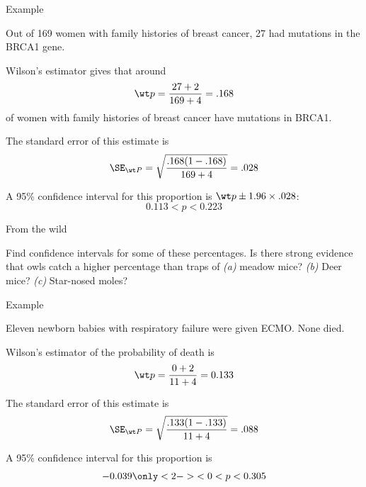 \begin{frame}{Example}

    Out of 169 women with family histories of breast cancer, 27 had mutations in the BRCA1 gene.

    \vspace{2em}

    \alert{Wilson's estimator} gives that around
        \[ \wt p = \frac{27 + 2}{169+4} = .168 \]
    of women with family histories of breast cancer have mutations in BRCA1.

    \vspace{2em}

    The \alert{standard error} of this estimate is
    \[ \SE_{\wt P} = \sqrt{\frac{.168(1-.168)}{169+4}} = .028  \]

    \vspace{2em}

    A \alert{95\% confidence interval} for this proportion is $\wt p \pm 1.96 \times .028$:
    \[ 0.113 < p < 0.223 \]

\end{frame}

\begin{frame}{From the wild}

    \begin{center}
    \end{center}

    \vspace{2em}

    Find confidence intervals for some of these percentages.  
    Is there strong evidence that owls catch a higher percentage than traps of 
    \textit{(a)} meadow mice?
    \textit{(b)} Deer mice?
    \textit{(c)} Star-nosed moles?


\end{frame}

\begin{frame}{Example}

    Eleven newborn babies with respiratory failure were given ECMO.  None died.

    \vspace{2em}

    \alert{Wilson's estimator} of the probability of death is
    \[ \wt p = \frac{0+2}{11+4} = 0.133 \]

    \vspace{2em}

    The \alert{standard error} of this estimate is
    \[ \SE_{\wt P} = \sqrt{\frac{ .133(1-.133) }{ 11+4 }} = .088 \]

    \vspace{2em}

    A \alert{95\% confidence interval} for this proportion is
        \[ -0.039 \only<2->{ < 0 }< p < 0.305 \]


\end{frame}

